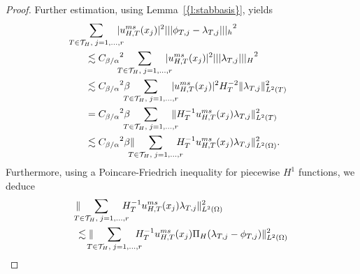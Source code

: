 \documentclass[10pt]{article}
\numberwithin{equation}{section}
\theoremstyle{plain}
\theoremstyle{definition}
\theoremstyle{remark}
\begin{document}
\begin{proof}
  
  
  
  
  
  
  Further estimation, using {Lemma~\ref{{l:stabbasis}}}, yields
  \begin{equation}
    \begin{aligned}\label{eq:discrete3}
      &\hspace{-2ex}\sum_{T\in{\mathcal{T}}_H,\;j=1,\ldots,r}\hspace{-2ex}|{u^{ms}_{H,T}}(x_j)|^2{||| {\phi_{T,j}-\lambda_{T,j}} |||_h}^2\\%
      &\quad\lesssim{C_{{\beta}/{\alpha}}}^2\hspace{-2ex}\sum_{T\in{\mathcal{T}}_H,\;j=1,\ldots,r}\hspace{-2ex}|{u^{ms}_{H,T}}(x_j)|^2{||| {\lambda_{T,j}} |||_H}^2 \\
      &\quad\lesssim{C_{{\beta}/{\alpha}}}^2{\beta}\hspace{-2ex}\sum_{T\in{\mathcal{T}}_H,\;j=1,\ldots,r}\hspace{-2ex}|{u^{ms}_{H,T}}(x_j)|^2H_T^{-2}\|\lambda_{T,j}\|_{L^2(T)}^2 \\
      &\quad= {C_{{\beta}/{\alpha}}}^2{\beta}\hspace{-2ex}\sum_{T\in{\mathcal{T}}_H,\;j=1,\ldots,r}\hspace{-2ex}\|H^{-1}_T{u^{ms}_{H,T}}(x_j)\lambda_{T,j}\|_{L^2(T)}^2 \\
      &\quad\lesssim {C_{{\beta}/{\alpha}}}^2{\beta}\|\hspace{-2ex}\sum_{T\in{\mathcal{T}}_H,\;j=1,\ldots,r}\hspace{-2ex}H^{-1}_T{u^{ms}_{H,T}}(x_j)\lambda_{T,j}\|_{L^2(\Omega)}^2. \\
    \end{aligned}
  \end{equation}
  Furthermore, using a Poincare-Friedrich inequality for piecewise $H^1$ functions, we deduce
  \begin{equation}\label{eq:discrete4}
    \begin{aligned}
      &\|\hspace{-2ex}\sum_{T\in{\mathcal{T}}_H,\;j=1,\ldots,r}\hspace{-2ex}H_T^{-1}{u^{ms}_{H,T}}(x_j)\lambda_{T,j}\|_{L^2(\Omega)}^2 \\
      &\lesssim\|\hspace{-2ex}\sum_{T\in{\mathcal{T}}_H,\;j=1,\ldots,r}\hspace{-2ex}H_T^{-1}{u^{ms}_{H,T}}(x_j){\Pi_H}(\lambda_{T,j}-\phi_{T,j})\|_{L^2(\Omega)}^2 \\

\end{aligned}
\end{equation}
\end{proof}
\end{document}
